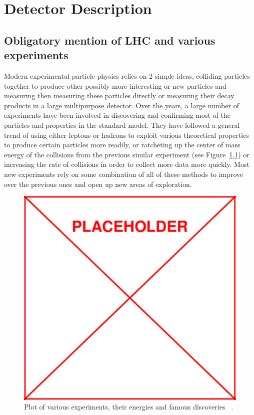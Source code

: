 \chapter{Detector Description}
	\section{Obligatory mention of LHC and various experiments}
	Modern experimental particle physics relies on 2 simple ideas, colliding particles together to produce other possibly more interesting or new particles and measuring then measuring these particles directly or measuring their decay products in a large multipurpose detector. Over the years, a large number of experiments have been involved in discovering and confirming most of the particles and properties in the standard model. They have followed a general trend of using either leptons or hadrons to exploit various theoretical properties to produce certain particles more readily, or ratcheting up the center of mass energy of the collisions from the previous similar experiment (see Figure~\ref{fig:experiment_energies}) or increasing the rate of collisions in order to collect more data more quickly. Most new experiments rely on some combination of all of these methods to improve over the previous ones and open up new areas of exploration.\\
	
		\begin{figure}[h]
\begin{center}
\includegraphics[width=0.48\linewidth]{Figs/placeholder.pdf}
\caption{\label{fig:experiment_energies}
Plot of various experiments, their energies and famous discoveries ~\cite{}.
}
\end{center}
\end{figure} 
	
